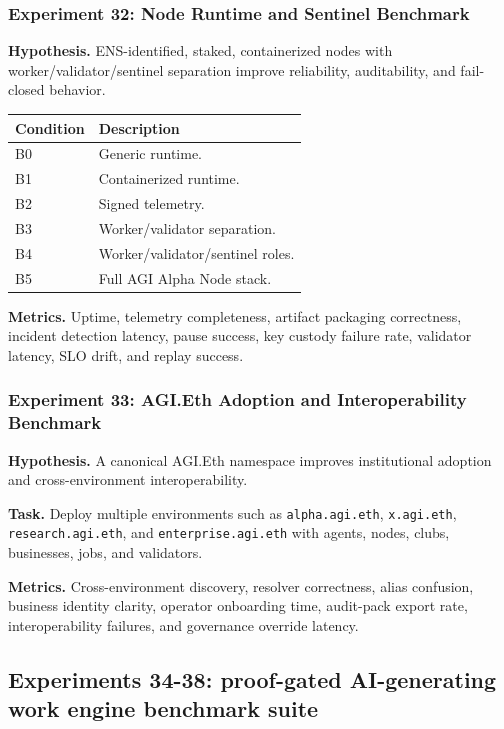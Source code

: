\subsubsection{Experiment 32: Node Runtime and Sentinel
Benchmark}\label{experiment-32-node-runtime-and-sentinel-benchmark}

\textbf{Hypothesis.} ENS-identified, staked, containerized nodes with
worker/validator/sentinel separation improve reliability, auditability,
and fail-closed behavior.

\begin{longtable}[]{@{}ll@{}}
\toprule\noalign{}
Condition & Description \\
\midrule\noalign{}
\endhead
\bottomrule\noalign{}
\endlastfoot
B0 & Generic runtime. \\
B1 & Containerized runtime. \\
B2 & Signed telemetry. \\
B3 & Worker/validator separation. \\
B4 & Worker/validator/sentinel roles. \\
B5 & Full AGI Alpha Node stack. \\
\end{longtable}

\textbf{Metrics.} Uptime, telemetry completeness, artifact packaging
correctness, incident detection latency, pause success, key custody
failure rate, validator latency, SLO drift, and replay success.

\subsubsection{Experiment 33: AGI.Eth Adoption and Interoperability
Benchmark}\label{experiment-33-agi.eth-adoption-and-interoperability-benchmark}

\textbf{Hypothesis.} A canonical AGI.Eth namespace improves
institutional adoption and cross-environment interoperability.

\textbf{Task.} Deploy multiple environments such as
\texttt{alpha.agi.eth}, \texttt{x.agi.eth}, \texttt{research.agi.eth},
and \texttt{enterprise.agi.eth} with agents, nodes, clubs, businesses,
jobs, and validators.

\textbf{Metrics.} Cross-environment discovery, resolver correctness,
alias confusion, business identity clarity, operator onboarding time,
audit-pack export rate, interoperability failures, and governance
override latency.

\subsection{Experiments 34-38: proof-gated AI-generating work engine
benchmark
suite}\label{experiments-34-38-proof-gated-ai-generating-work-engine-benchmark-suite}

